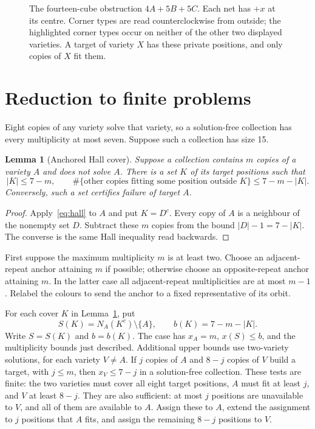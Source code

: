 \documentclass[11pt]{article}
\newtheorem{lemma}[theorem]{Lemma}
\theoremstyle{remark}
\begin{document}
\begin{figure}[ht]
\centering

\caption{The fourteen-cube obstruction $4A+5B+5C$. Each net has $+x$ at its
centre. Corner types are read counterclockwise from outside; the
highlighted corner types occur on neither of the other two displayed varieties.
A target of variety $X$ has
these private positions, and only copies of $X$ fit them.}
\label{fig:obstruction}
\end{figure}

\section{Reduction to finite problems}\label{sec:cases}
Eight copies of any variety solve that variety, so a solution-free collection
has every multiplicity at most seven. Suppose such a collection has size 15.

\begin{lemma}[Anchored Hall cover]\label{lem:anchor}
Suppose a collection contains $m$ copies of a variety $A$ and does not solve
$A$. There is a set $K$ of its target positions such that
\begin{equation}\label{eq:anchor}
 |K|\le 7-m,\qquad
 \#\{\text{other copies fitting some position outside }K\}
       \le 7-m-|K|.
\end{equation}
Conversely, such a set certifies failure of target $A$.
\end{lemma}
\begin{proof}
Apply~\eqref{eq:hall} to $A$ and put $K=D^c$. Every copy of $A$ is a
neighbour of the nonempty set $D$. Subtract these $m$ copies from the bound
$|D|-1=7-|K|$. The converse is the same Hall inequality read backwards.
\end{proof}

First suppose the maximum multiplicity $m$ is at least two. Choose an
adjacent-repeat anchor attaining $m$ if possible; otherwise choose an
opposite-repeat anchor attaining $m$. In the latter case all adjacent-repeat
multiplicities are at most $m-1$. Relabel the colours to send the anchor to
a fixed representative of its orbit.

For each cover $K$ in Lemma~\ref{lem:anchor}, put
\[
 S(K)=N_A(K^c)\setminus\{A\},\qquad b(K)=7-m-|K|.
\]
Write $S=S(K)$ and $b=b(K)$. The case has
$x_A=m$, $x(S)\le b$, and the multiplicity bounds just described.
Additional upper bounds use two-variety solutions, for each variety $V\ne A$.
If $j$ copies of $A$
and $8-j$ copies of $V$ build a target, with $j\le m$, then
$x_V\le 7-j$ in a solution-free collection. These tests are finite:
the two varieties must cover all eight target positions, $A$ must fit at
least $j$, and $V$ at least $8-j$. They are also sufficient: at most $j$
positions are unavailable to $V$,
and all of them are available to $A$. Assign these to $A$, extend the
assignment to $j$ positions that $A$ fits, and assign the remaining
$8-j$ positions to $V$.
\end{document}
